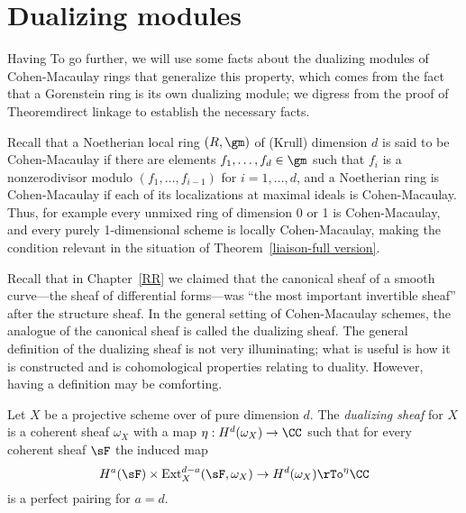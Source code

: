 \section{Dualizing modules}\label{duality}
Having
To go further, we will use some facts about the dualizing modules of Cohen-Macaulay rings that generalize this
property, which comes from the fact that a Gorenstein ring is its own dualizing module; we digress from the 
proof of Theorem{direct linkage} to establish the necessary facts.

Recall that a Noetherian local ring $(R,\gm)$ of (Krull) dimension $d$ is said to be Cohen-Macaulay if there are elements $f_1,\dots,f_d\in \gm$ such that
$f_i$ is a nonzerodivisor modulo $(f_1,\dots,f_{i-1})$ for $i =1,\dots,d$, and a Noetherian ring is Cohen-Macaulay if each of its localizations at maximal ideals
is Cohen-Macaulay. Thus, for example every unmixed ring of dimension 0 or 1 is Cohen-Macaulay, and every purely 1-dimensional scheme is locally Cohen-Macaulay,
making the condition relevant in the situation of Theorem~\ref{liaison-full version}. 

Recall that in Chapter~\ref{RR} we claimed that the canonical sheaf of a smooth curve---the sheaf of differential forms---was ``the most important invertible sheaf'' after the structure sheaf. In the general setting of Cohen-Macaulay schemes, the analogue of the canonical sheaf is called the dualizing sheaf.
The general definition of the dualizing sheaf is not very illuminating; what is useful is how it is constructed and is cohomological properties relating to duality.
However, having a definition may be comforting. 

\begin{definition}
Let $X$ be a projective scheme over of pure dimension $d$. The \emph{dualizing sheaf} for $X$ is a coherent sheaf $\omega_X$ 
with a map $\eta: H^d(\omega_X) \to \CC$ such that for every coherent sheaf  $\sF$ the induced map
$$
H^a(\sF) \times { \rm Ext}_X^{d-a}(\sF, \omega_X) \to H^d(\omega_X) \rTo^\eta \CC
$$
is a perfect pairing for $a=d$. 
\end{definition}


